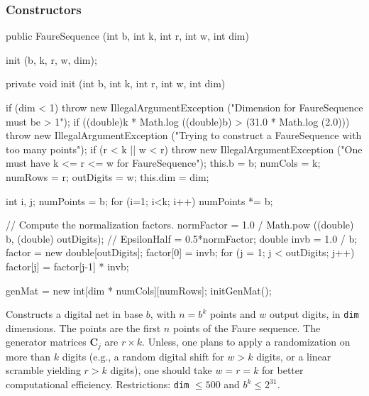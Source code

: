 \subsubsection* {Constructors}
\begin{code}

   public FaureSequence (int b, int k, int r, int w, int dim) \begin{hide} {
      init (b, k, r, w, dim);
   }

   private void init (int b, int k, int r, int w, int dim) {
      if (dim < 1)
         throw new IllegalArgumentException
            ("Dimension for FaureSequence must be > 1");
      if ((double)k * Math.log ((double)b) > (31.0 * Math.log (2.0)))
         throw new IllegalArgumentException
            ("Trying to construct a FaureSequence with too many points");
      if (r < k || w < r)
         throw new IllegalArgumentException
            ("One must have k <= r <= w for FaureSequence");
      this.b    = b;
      numCols   = k;
      numRows   = r;
      outDigits = w;
      this.dim  = dim;

      int i, j;
      numPoints = b;
      for (i=1; i<k; i++) numPoints *= b;

      // Compute the normalization factors.
      normFactor = 1.0 / Math.pow ((double) b, (double) outDigits);
//      EpsilonHalf = 0.5*normFactor;
      double invb = 1.0 / b;
      factor = new double[outDigits];
      factor[0] = invb;
      for (j = 1; j < outDigits; j++)
         factor[j] = factor[j-1] * invb;

      genMat = new int[dim * numCols][numRows];
      initGenMat();
   }
\end{hide}
\end{code}
\begin{tabb}
    Constructs a digital net in base $b$,
    with $n = b^k$ points and $w$ output digits,
    in \texttt{dim} dimensions.
    The points are the first $n$ points of the Faure sequence.
    The generator matrices $\mathbf{C}_j$ are $r\times k$.
    Unless, one plans to apply a randomization on more than $k$ digits
    (e.g., a random digital shift for $w > k$ digits, or a linear
    scramble yielding $r > k$ digits), one should
    take $w = r = k$ for better computational efficiency.
    Restrictions: \texttt{dim} $\le 500$ and $b^k \le 2^{31}$.
\end{tabb}
\begin{htmlonly}
\end{htmlonly}
